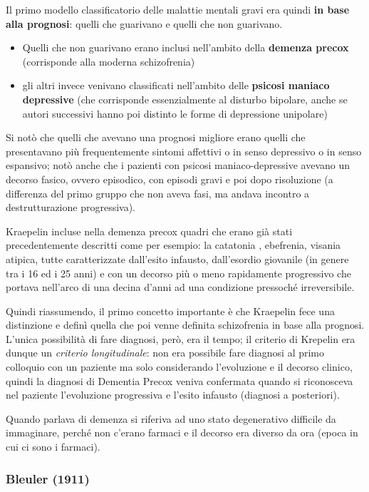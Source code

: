 Il primo modello classificatorio delle malattie mentali gravi era quindi
\textbf{in base alla prognosi}: quelli che guarivano e quelli che non
guarivano.

\begin{itemize}
\item
  Quelli che non guarivano erano inclusi nell'ambito della
  \textbf{demenza precox} (corrisponde alla moderna schizofrenia)
\item
  gli altri invece venivano classificati nell'ambito delle
  \textbf{psicosi maniaco depressive} (che corrisponde essenzialmente al
  disturbo bipolare, anche se autori successivi hanno poi distinto le
  forme di depressione unipolare)
\end{itemize}

Si notò che quelli che avevano una prognosi migliore erano quelli che
presentavano più frequentemente sintomi affettivi o in senso depressivo
o in senso espansivo; notò anche che i pazienti con psicosi
maniaco-depressive avevano un decorso fasico, ovvero episodico, con
episodi gravi e poi dopo risoluzione (a differenza del primo gruppo che
non aveva fasi, ma andava incontro a destrutturazione progressiva).

Kraepelin incluse nella demenza precox quadri che erano già stati
precedentemente descritti come per esempio: la catatonia , ebefrenia,
visania atipica, tutte caratterizzate dall'esito infausto, dall'esordio
giovanile (in genere tra i 16 ed i 25 anni) e con un decorso più o meno
rapidamente progressivo che portava nell'arco di una decina d'anni ad
una condizione pressoché irreversibile.

Quindi riassumendo, il primo concetto importante è che Kraepelin fece
una distinzione e definì quella che poi venne definita schizofrenia in
base alla prognosi. L'unica possibilità di fare diagnosi, però, era il
tempo; il criterio di Krepelin era dunque un \emph{criterio
longitudinale}: non era possibile fare diagnosi al primo colloquio con
un paziente ma solo considerando l'evoluzione e il decorso clinico,
quindi la diagnosi di Dementia Precox veniva confermata quando si
riconosceva nel paziente l'evoluzione progressiva e l'esito infausto
(diagnosi a posteriori).

Quando parlava di demenza si riferiva ad uno stato degenerativo
difficile da immaginare, perché non c'erano farmaci e il decorso era
diverso da ora (epoca in cui ci sono i farmaci).

\subsubsection{Bleuler (1911)}


